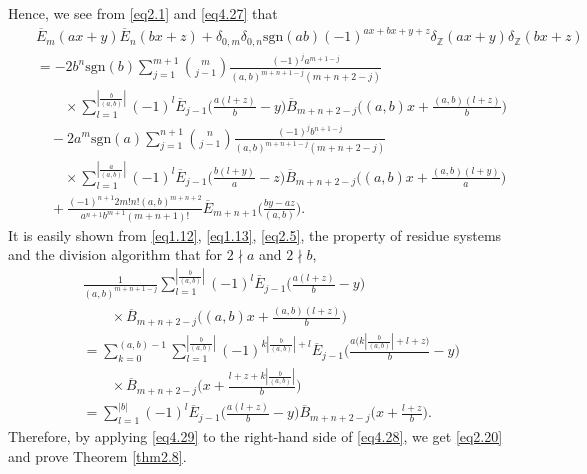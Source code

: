 \documentclass[reqno]{amsart}
\numberwithin{equation}{section}
\begin{document}
Hence, we see from \eqref{eq2.1} and \eqref{eq4.27} that
\begin{eqnarray}\label{eq4.28}
&&\overline{E}_{m}(ax+y)\overline{E}_{n}(bx+z)+\delta_{0,m}\delta_{0,n}\mathrm{sgn}(ab)(-1)^{ax+bx+y+z}\delta_{\mathbb{Z}}(ax+y)\delta_{\mathbb{Z}}(bx+z)\nonumber\\
&&=-2b^{n}\mathrm{sgn}(b)
\sum_{j=1}^{m+1}\binom{m}{j-1}\frac{(-1)^{j}a^{m+1-j}}{(a,b)^{m+n+1-j}(m+n+2-j)}\nonumber\\
&&\qquad\times\sum_{l=1}^{|\frac{b}{(a,b)}|}(-1)^{l}\overline{E}_{j-1}\biggl(\frac{a(l+z)}{b}-y\biggl)
\overline{B}_{m+n+2-j}\biggl((a,b)x+\frac{(a,b)(l+z)}{b}\biggl)\nonumber\\
&&\quad-2a^{m}\mathrm{sgn}(a)\sum_{j=1}^{n+1}\binom{n}{j-1}\frac{(-1)^{j}b^{n+1-j}}{(a,b)^{m+n+1-j}(m+n+2-j)}\nonumber\\
&&\qquad\times\sum_{l=1}^{|\frac{a}{(a,b)}|}(-1)^{l}\overline{E}_{j-1}\biggl(\frac{b(l+y)}{a}-z\biggl)
\overline{B}_{m+n+2-j}\biggl((a,b)x+\frac{(a,b)(l+y)}{a}\biggl)\nonumber\\
&&\quad+\frac{(-1)^{n+1}2m!n!(a,b)^{m+n+2}}{a^{n+1}b^{m+1}(m+n+1)!}\overline{E}_{m+n+1}\biggl(\frac{by-az}{(a,b)}\biggl).
\end{eqnarray}
It is easily shown from \eqref{eq1.12}, \eqref{eq1.13}, \eqref{eq2.5}, the property of residue systems and the division algorithm that for $2\nmid a$ and $2\nmid b$,
\begin{eqnarray}\label{eq4.29}
&&\frac{1}{(a,b)^{m+n+1-j}}\sum_{l=1}^{|\frac{b}{(a,b)}|}(-1)^{l}
\overline{E}_{j-1}\biggl(\frac{a(l+z)}{b}-y\biggl)\nonumber\\
&&\qquad\times\overline{B}_{m+n+2-j}\biggl((a,b)x+\frac{(a,b)(l+z)}{b}\biggl)\nonumber\\
&&=\sum_{k=0}^{(a,b)-1}\sum_{l=1}^{|\frac{b}{(a,b)}|}(-1)^{k|\frac{b}{(a,b)}|+l}\overline{E}_{j-1}\biggl(\frac{a\bigl(k|\frac{b}{(a,b)}|+l+z\bigl)}{b}-y\biggl)\nonumber\\
&&\qquad\times\overline{B}_{m+n+2-j}\biggl(x+\frac{l+z+k|\frac{b}{(a,b)}|}{b}\biggl)\nonumber\\
&&=\sum_{l=1}^{|b|}(-1)^{l}\overline{E}_{j-1}\biggl(\frac{a(l+z)}{b}-y\biggl)\overline{B}_{m+n+2-j}\biggl(x+\frac{l+z}{b}\biggl).
\end{eqnarray}
Therefore, by applying \eqref{eq4.29} to the right-hand side of \eqref{eq4.28}, we get \eqref{eq2.20} and prove Theorem \ref{thm2.8}.
\end{document}
